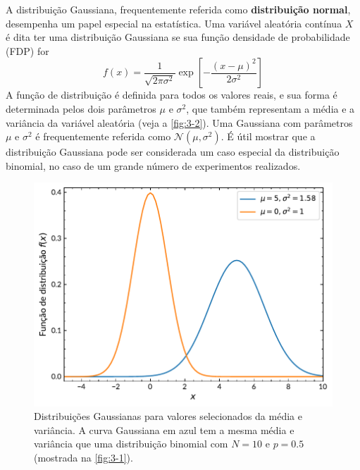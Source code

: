A distribuição Gaussiana, frequentemente referida como \textbf{distribuição normal}, desempenha um papel especial na estatística. Uma variável aleatória contínua $X$ é dita ter uma distribuição Gaussiana se sua função densidade de probabilidade (FDP) for
\begin{equation}
f(x) = \dfrac{1}{\sqrt{2\pi \sigma^2}} \exp\left[-\dfrac{(x-\mu)^2}{2\sigma^2}\right]
\end{equation}
A função de distribuição é definida para todos os valores reais, e sua forma é determinada pelos dois parâmetros $\mu$ e $\sigma^2$, que também representam a média e a variância da variável aleatória (veja a \autoref{fig:3-2}). Uma Gaussiana com parâmetros $\mu$ e $\sigma^2$ é frequentemente referida como $\mathcal{N}(\mu, \sigma^2)$. É útil mostrar que a distribuição Gaussiana pode ser considerada um caso especial da distribuição binomial, no caso de um grande número de experimentos realizados.

\begin{figure}
	\centering
	\includegraphics[width=0.7\linewidth]{Figuras/3-2.pdf}
	\caption{Distribuições Gaussianas para valores selecionados da média e variância. A curva Gaussiana em azul tem a mesma média e variância que uma distribuição binomial com $N = 10$ e $p = 0.5$ (mostrada na \autoref{fig:3-1}).}
	\label{fig:3-2}
\end{figure}
